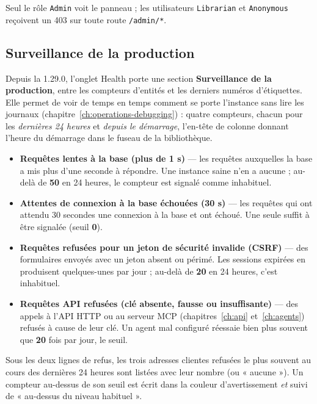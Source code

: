 Seul le rôle \texttt{Admin} voit le panneau ; les utilisateurs
\texttt{Librarian} et \texttt{Anonymous} reçoivent un 403 sur toute
route \texttt{/admin/*}.

\subsection*{Surveillance de la production}\label{sec:health-watch}

Depuis la 1.29.0, l'onglet Health porte une section
\textbf{Surveillance de la production}, entre les compteurs d'entités
et les derniers numéros d'étiquettes. Elle permet de voir de temps en temps comment se
porte l'instance sans lire les journaux
(chapitre~\ref{ch:operations-debugging}) : quatre compteurs, chacun pour les
\emph{dernières 24 heures} et \emph{depuis le démarrage}, l'en-tête de
colonne donnant l'heure du démarrage dans le fuseau de la
bibliothèque.

\begin{itemize}
  \item \textbf{Requêtes lentes à la base (plus de 1 s)} — les requêtes
        auxquelles la base a mis plus d'une seconde à répondre. Une
        instance saine n'en a aucune ; au-delà de \textbf{50} en
        24 heures, le compteur est signalé comme inhabituel.
  \item \textbf{Attentes de connexion à la base échouées (30 s)} — les
        requêtes qui ont attendu 30 secondes une connexion à la base et
        ont échoué. Une seule suffit à être signalée (seuil
        \textbf{0}).
  \item \textbf{Requêtes refusées pour un jeton de sécurité invalide
        (CSRF)} — des formulaires envoyés avec un jeton absent ou
        périmé. Les sessions expirées en produisent quelques-unes par
        jour ; au-delà de \textbf{20} en 24 heures, c'est inhabituel.
  \item \textbf{Requêtes API refusées (clé absente, fausse ou
        insuffisante)} — des appels à l'API HTTP ou au serveur MCP
        (chapitres~\ref{ch:api} et~\ref{ch:agents}) refusés à cause de
        leur clé. Un agent mal configuré réessaie bien plus souvent que
        \textbf{20} fois par jour, le seuil.
\end{itemize}

Sous les deux lignes de refus, les trois adresses clientes refusées le
plus souvent au cours des dernières 24 heures sont listées avec leur
nombre (ou « aucune »). Un compteur au-dessus de son seuil est écrit
dans la couleur d'avertissement \emph{et} suivi de « au-dessus du
niveau habituel ».

